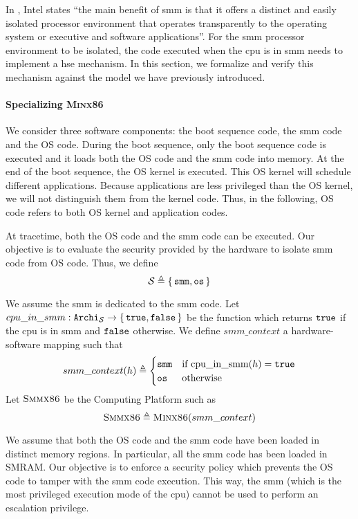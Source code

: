 In \cite{intel2014manual}, Intel states ``the main benefit of \ac{smm} is that
it offers a distinct and easily isolated processor environment that operates
transparently to the operating system or executive and software applications''.
%
For the \ac{smm} processor environment to be isolated, the code executed when
the \ac{cpu} is in \ac{smm} needs to implement a \ac{hse} mechanism.
%
In this section, we formalize and verify this mechanism against the model we
have previously introduced.

\paragraph{Specializing {\scshape Minx86}}
%
We consider three software components: the boot sequence code, the \ac{smm} code
and the OS code.
%
During the boot sequence, only the boot sequence code is executed and it loads
both the OS code and the \ac{smm} code into memory.
%
At the end of the boot sequence, the OS kernel is executed.
%
This OS kernel will schedule different applications.
%
Because applications are less privileged than the OS kernel, we will not
distinguish them from the kernel code.
%
Thus, in the following, OS code refers to both OS kernel and application codes.

At tracetime, both the OS code and the \ac{smm} code can be executed.
%
Our objective is to evaluate the security provided by the hardware to isolate
\ac{smm} code from OS code.
%
Thus, we define
%
\[
  \mathcal{S} \triangleq \{\,\mathtt{smm}, \mathtt{os}\,\}
\]

We assume the \ac{smm} is dedicated to the \ac{smm} code.
%
Let
$cpu\_in\_smm : \texttt{Archi}_{\mathcal{S}} \rightarrow \{\,\mathtt{true},
  \mathtt{false}\,\}$ be the function which returns $\mathtt{true}$ if the \ac{cpu} is in
\ac{smm} and $\mathtt{false}$ otherwise.
%
We define $smm\_context$ a hardware-software mapping such that
%
\[
  smm\_context(h) \triangleq
  \begin{cases}
    \mathtt{smm} & \text{if } \mathrm{cpu\_in\_smm}(h) = \mathtt{true} \\
    \mathtt{os} & \text{otherwise}
  \end{cases}
\]
%
Let $\textsc{Smmx86}$ be the Computing Platform such as
%
\[
  \textsc{Smmx86} \triangleq \textsc{Minx86}(smm\_context)
\]

We assume that both the OS code and the \ac{smm} code have been loaded in
distinct memory regions. In particular, all the \ac{smm} code has been loaded in
SMRAM.
%
Our objective is to enforce a security policy which prevents the OS code to
tamper with the \ac{smm} code execution.
%
This way, the \ac{smm} (which is the most privileged execution mode of the
\ac{cpu}) cannot be used to perform an escalation privilege.

